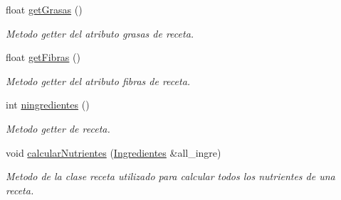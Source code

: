 \begin{DoxyCompactItemize}
$$float \hyperlink{classreceta_ab1c63c527e92f4a525a1288e68f6d895}{get\+Grasas} ()
\begin{DoxyCompactList}\small\item\em Metodo getter del atributo grasas de receta. \end{DoxyCompactList}\item 
float \hyperlink{classreceta_a13819688407b0e6927a295cee0948cef}{get\+Fibras} ()
\begin{DoxyCompactList}\small\item\em Metodo getter del atributo fibras de receta. \end{DoxyCompactList}\item 
int \hyperlink{classreceta_a7ab9669bb735e19cdfa1b2fce720bd21}{ningredientes} ()
\begin{DoxyCompactList}\small\item\em Metodo getter de receta. \end{DoxyCompactList}\item 
void \hyperlink{classreceta_adce4140e595d20b43aa7c7f643003bdd}{calcular\+Nutrientes} (\hyperlink{classIngredientes}{Ingredientes} \&all\+\_\+ingre)
\begin{DoxyCompactList}\small\item\em Metodo de la clase receta utilizado para calcular todos los nutrientes de una receta. \end{DoxyCompactList}\end{DoxyCompactItemize}
